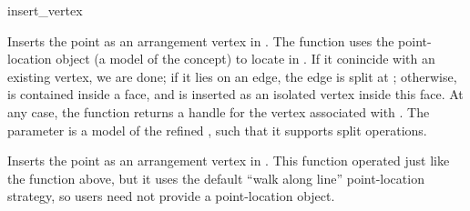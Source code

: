 
\ccRefPageBegin

\begin{ccRefFunction}{insert_vertex}


   {Inserts the point  as an arrangement vertex in .
    The function uses the point-location object  (a model of the
     concept) to locate  in .
    If it conincide with an existing vertex, we are done; if it lies on an
    edge, the edge is split at ; otherwise,  is contained inside
    a face, and is inserted as an isolated vertex inside this face.
    At any case, the function returns a handle for the vertex associated
    with . The  parameter is a model of the refined
    , such that it supports split operations.
    }

   {Inserts the point  as an arrangement vertex in .
    This function operated just like the function above, but it uses the
    default ``walk along line'' point-location strategy, so users need not
    provide a point-location object.} 

\end{ccRefFunction}

\ccRefPageEnd
